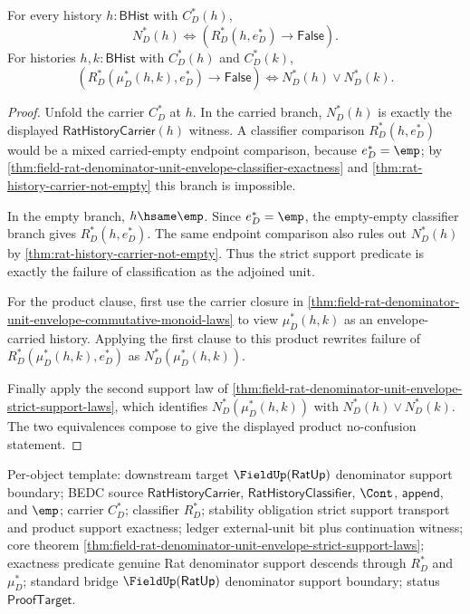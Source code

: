 \begin{theorem}
\label{thm:field-rat-denominator-unit-envelope-support-unit-noconfusion}
For every history $h:\mathsf{BHist}$ with $C_D^\ast(h)$,
$$
N_D^\ast(h)\Longleftrightarrow
(R_D^\ast(h,e_D^\ast)\to\mathsf{False}).
$$
For histories $h,k:\mathsf{BHist}$ with $C_D^\ast(h)$ and $C_D^\ast(k)$,
$$
(R_D^\ast(\mu_D^\ast(h,k),e_D^\ast)\to\mathsf{False})
\Longleftrightarrow N_D^\ast(h)\lor N_D^\ast(k).
$$
\end{theorem}
\begin{proof}
Unfold the carrier $C_D^\ast$ at $h$. In the carried branch, $N_D^\ast(h)$ is
exactly the displayed $\mathsf{RatHistoryCarrier}(h)$ witness. A classifier
comparison $R_D^\ast(h,e_D^\ast)$ would be a mixed carried-empty endpoint
comparison, because $e_D^\ast=\emp$; by
\autoref{thm:field-rat-denominator-unit-envelope-classifier-exactness} and
\autoref{thm:rat-history-carrier-not-empty} this branch is impossible.

In the empty branch, $h\hsame\emp$. Since $e_D^\ast=\emp$, the empty-empty
classifier branch gives $R_D^\ast(h,e_D^\ast)$. The same endpoint comparison
also rules out $N_D^\ast(h)$ by
\autoref{thm:rat-history-carrier-not-empty}. Thus the strict support predicate
is exactly the failure of classification as the adjoined unit.

For the product clause, first use the carrier closure in
\autoref{thm:field-rat-denominator-unit-envelope-commutative-monoid-laws} to
view $\mu_D^\ast(h,k)$ as an envelope-carried history. Applying the first clause
to this product rewrites failure of
$R_D^\ast(\mu_D^\ast(h,k),e_D^\ast)$ as
$N_D^\ast(\mu_D^\ast(h,k))$.

Finally apply the second support law of
\autoref{thm:field-rat-denominator-unit-envelope-strict-support-laws}, which
identifies $N_D^\ast(\mu_D^\ast(h,k))$ with
$N_D^\ast(h)\lor N_D^\ast(k)$. The two equivalences compose to give the
displayed product no-confusion statement.
\end{proof}

Per-object template: downstream target $\FieldUp(\mathsf{RatUp})$ denominator
support boundary; BEDC source $\mathsf{RatHistoryCarrier}$,
$\mathsf{RatHistoryClassifier}$, $\Cont$, $\mathsf{append}$, and $\emp$;
carrier $C_D^\ast$; classifier $R_D^\ast$; stability obligation strict support
transport and product support exactness; ledger external-unit bit plus
continuation witness; core theorem
\autoref{thm:field-rat-denominator-unit-envelope-strict-support-laws};
exactness predicate genuine Rat denominator support descends through
$R_D^\ast$ and $\mu_D^\ast$; standard bridge
$\FieldUp(\mathsf{RatUp})$ denominator support boundary; status
$\mathsf{ProofTarget}$.


